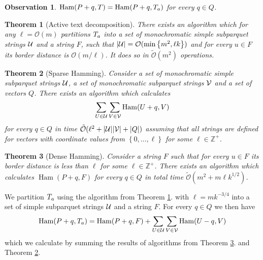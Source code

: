 \documentclass[11pt]{article}
\DeclareMathOperator*{\Ham}{Ham}
\newcommand{\Z}{\mathbb{Z}}
\renewcommand{\O}{\mathcal{O}}
\newcommand{\tO}{\tilde{\mathcal{O}}}
\newcommand{\set}[1]{\left\lbrace #1 \right\rbrace}
\theoremstyle{plain}
\newtheorem{theorem}{Theorem}
\newtheorem{observation}{Observation}
\theoremstyle{definition}
\theoremstyle{remark}
\begin{document}
\begin{observation}
	$\Ham(P + q, T) = \Ham(P + q, \Ta)$ for every $q \in Q$.
\end{observation}


\begin{theorem}[Active text decomposition]\label{text_decomposition}
	There exists an algorithm which for any $\ell = \O(m)$ partitions $T_a$ into a set of monochromatic simple subparquet strings $\mathcal{U}$ and a string $F$,
	such that $|\U| = \O(\min\set{m^2, \ell k})$ and for every $u \in F$ its border distance is $\O(m / \ell)$.
	It does so in $\tO(m^2)$ operations.
\end{theorem}


\begin{theorem}[Sparse Hamming]\label{sparse_algo}
	Consider a set of monochromatic simple subparquet strings $\mathcal{U}$, a set of monochromatic subparquet strings $\mathcal{V}$ and a set of vectors $Q$.
	There exists an algorithm which calculates
	$$ \sum_{U \in \U}\sum_{V \in \V} \Ham(U + q, V) $$
	for every $q \in Q$ in time $\tO(\ell^2 + |\U||\V| + |Q|)$ assuming that all strings are defined for vectors with coordinate values from $\set{0, \dots, \ell}$ for some $\ell \in \Z^+$.
\end{theorem}


\begin{theorem}[Dense Hamming]
	\label{dense_algo}
	Consider a string $F$ such that for every $u \in F$ its border distance is less than $\ell$ for some $\ell \in \Z^+$.
	There exists an algorithm which calculates $\Ham(P + q, F)$ for every $q \in Q$ in total time $\tO(m^2 + m \ell k^{1/2})$.
\end{theorem}


We partition $T_a$ using the algorithm from Theorem \ref{text_decomposition}. with $\ell = mk^{-3/4}$ into a set of simple subparquet strings $\mathcal{U}$ and a string $F$.
For every $q \in Q$ we then have
$$ \Ham(P + q, \Ta) = \Ham(P + q, F) + \sum_{U \in \U}\sum_{V \in \V} \Ham(U - q, V) $$
which we calculate by summing the results of algorithms from Theorem \ref{dense_algo}. and Theorem \ref{sparse_algo}.


\end{document}
